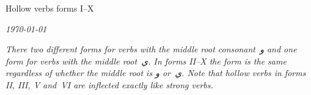 \documentclass{article}
\begin{document}
\center

\centerline{\huge Hollow verbs forms I--X}

\smallskip
\centerline{\footnotesize\itshape \today}

\vfill

 \begin{minipage}{.7\textwidth}
   \itshape
There two different forms for verbs with the middle root consonant~\textarabic{و} and one form for verbs with the middle root~\textarabic{ي}. In forms II--X the form is the same regardless of whether the middle root is \textarabic{و} or~\textarabic{ي}. Note that hollow verbs in forms II, III, V and~VI  are inflected exactly like strong verbs.
 \end{minipage}

\vfill

\end{document}
